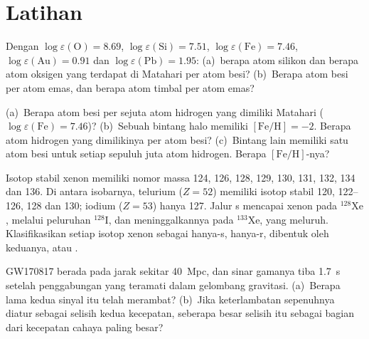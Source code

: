 \section{Latihan}

\begin{exercise}[$\star$]\label{exo:b3:origin-of-elements:1}
Dengan  $\log\varepsilon(\mathrm{O}) = 8.69$,
$\log\varepsilon(\mathrm{Si}) = 7.51$, $\log\varepsilon(\mathrm{Fe}) =
7.46$, $\log\varepsilon(\mathrm{Au}) = 0.91$ dan
$\log\varepsilon(\mathrm{Pb}) = 1.95$: (a)~berapa atom silikon dan
berapa atom oksigen yang terdapat di Matahari per atom besi? (b)~Berapa
atom besi per atom emas, dan berapa atom timbal per atom emas?
\end{exercise}

\begin{exercise}[$\star$]\label{exo:b3:origin-of-elements:2}
(a)~Berapa atom besi per sejuta atom hidrogen yang dimiliki Matahari
($\log\varepsilon(\mathrm{Fe}) = 7.46$)? (b)~Sebuah bintang halo memiliki
$[\mathrm{Fe/H}] = -2$. Berapa atom hidrogen yang dimilikinya per atom
besi? (c)~Bintang lain memiliki satu atom besi untuk setiap sepuluh juta
atom hidrogen. Berapa $[\mathrm{Fe/H}]$-nya?
\end{exercise}

\begin{exercise}[$\star$]\label{exo:b3:origin-of-elements:3}
Isotop stabil xenon memiliki nomor massa 124, 126, 128, 129, 130,
131, 132, 134 dan 136. Di antara isobarnya, telurium ($Z = 52$) memiliki
isotop stabil 120, 122--126, 128 dan 130; iodium ($Z = 53$) hanya 127.
Jalur s mencapai xenon pada $^{128}\mathrm{Xe}$, melalui peluruhan
$^{128}\mathrm{I}$, dan meninggalkannya pada $^{133}\mathrm{Xe}$, yang meluruh.
Klasifikasikan setiap isotop xenon sebagai hanya-s, hanya-r, dibentuk oleh keduanya, atau
.
\end{exercise}

\begin{exercise}[$\star$]\label{exo:b3:origin-of-elements:4}
GW170817 berada pada jarak sekitar \qty{40}{Mpc}, dan sinar gamanya tiba
\qty{1.7}{s} setelah penggabungan yang teramati dalam gelombang gravitasi. (a)~Berapa lama
kedua sinyal itu telah merambat? (b)~Jika keterlambatan sepenuhnya diatur sebagai
selisih kedua kecepatan, seberapa besar selisih itu sebagai bagian
dari kecepatan cahaya paling besar?
\end{exercise}

